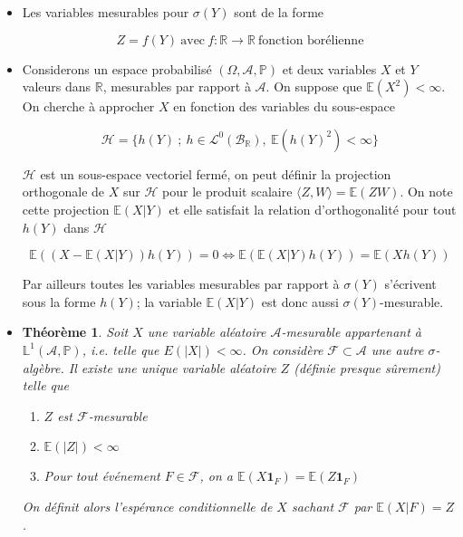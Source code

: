 \documentclass[10pt,a4paper,oneside]{article}
\newtheorem{theoreme}{Théorème}
\begin{document}
\begin{itemize}
\item
Les variables mesurables pour $\sigma(Y)$ sont de la forme

\[ Z = f(Y)\ \text{avec}\ f:\mathbb{R} \to \mathbb{R}\ \text{fonction borélienne} \]

\item
Considerons un espace probabilisé $(\Omega, \mathcal{A}, \mathbb{P})$ et deux variables $X$ et $Y$  valeurs dans $\mathbb{R}$, mesurables par rapport à $\mathcal{A}$. On suppose que $\mathbb{E}(X^2) < \infty$. On cherche à approcher $X$ en fonction des variables du sous-espace

\[ \mathcal{H} = \{ h(Y)\ ;\ h \in \mathcal{L}^0(\mathcal{B}_\mathbb{R}),\ \mathbb{E}(h(Y)^2) < \infty \} \]

$\mathcal{H}$ est un sous-espace vectoriel fermé, on peut définir la projection orthogonale de $X$ sur $\mathcal{H}$ pour le produit scalaire $\langle Z,W \rangle = \mathbb{E}(ZW)$. On note cette projection $\mathbb{E}(X | Y)$ et elle satisfait la relation d'orthogonalité pour tout $h(Y)$ dans $\mathcal{H}$

\[\mathbb{E}((X - \mathbb{E}(X | Y)) h(Y)) = 0 \Leftrightarrow \boxed{ \mathbb{E}( \mathbb{E}(X | Y) h(Y) ) = \mathbb{E}(X h(Y)) } \]

Par ailleurs toutes les variables mesurables par rapport à $\sigma(Y)$ s'écrivent sous la forme $h(Y)$; la variable $\mathbb{E}(X | Y)$ est donc aussi $\sigma(Y)$-mesurable.

\item
\begin{theoreme}
Soit $X$ une variable aléatoire $\mathcal{A}$-mesurable appartenant à $\mathbb{L}^1(\mathcal{A},\mathbb{P})$, i.e. telle que $E(|X|) < \infty$. On considère $\mathcal{F} \subset \mathcal{A}$ une autre $\sigma$-algèbre. Il existe une unique variable aléatoire $Z$ (définie presque sûrement) telle que

\begin{enumerate}
\item
$Z$ est $\mathcal{F}$-mesurable
\item
$\mathbb{E}(|Z|) < \infty$
\item
Pour tout événement $F \in \mathcal{F}$, on a $\mathbb{E}(X \textbf{1}_F) = \mathbb{E}(Z \textbf{1}_F)$
\end{enumerate}

On définit alors l'espérance conditionnelle de $X$ sachant $\mathcal{F}$ par $\mathbb{E}(X | F) = Z$.
\end{theoreme}


\end{itemize}
\end{document}
